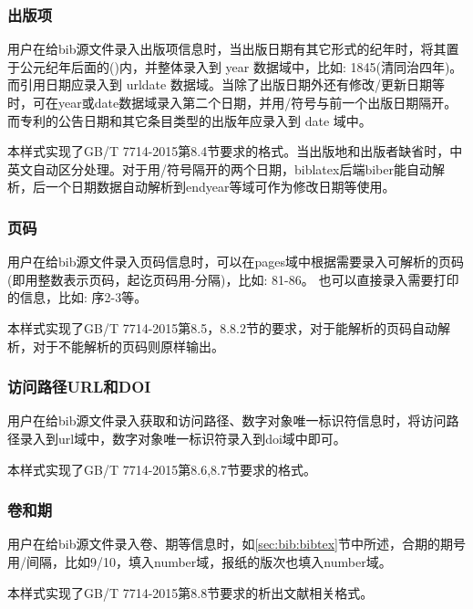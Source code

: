 \subsubsection{出版项}\label{sec:fmt:pubitem}

\begin{property}{}{}
用户在给bib源文件录入出版项信息时，当出版日期有其它形式的纪年时，将其置于公元纪年后面的()内，并整体录入到 year 数据域中，比如: 1845(清同治四年)。而引用日期应录入到 urldate 数据域。当除了出版日期外还有修改/更新日期等时，可在year或date数据域录入第二个日期，并用/符号与前一个出版日期隔开。而专利的公告日期和其它条目类型的出版年应录入到 date 域中。

本样式实现了GB/T 7714-2015第8.4节要求的格式。当出版地和出版者缺省时，中英文自动区分处理。对于用/符号隔开的两个日期，biblatex后端biber能自动解析，后一个日期数据自动解析到endyear等域可作为修改日期等使用。
\end{property}

\subsubsection{页码}\label{sec:fmt:pages}
\begin{property}{}{}
用户在给bib源文件录入页码信息时，可以在pages域中根据需要录入可解析的页码(即用整数表示页码，起讫页码用-分隔)，比如: 81-86。 也可以直接录入需要打印的信息，比如: 序2-3等。

本样式实现了GB/T 7714-2015第8.5，8.8.2节的要求，对于能解析的页码自动解析，对于不能解析的页码则原样输出。
\end{property}

\subsubsection{访问路径URL和DOI}
\begin{property}{}{}
用户在给bib源文件录入获取和访问路径、数字对象唯一标识符信息时，将访问路径录入到url域中，数字对象唯一标识符录入到doi域中即可。

本样式实现了GB/T 7714-2015第8.6,8.7节要求的格式。
\end{property}

\subsubsection{卷和期}\label{sec:fmt:volnum}
\begin{property}{}{}%
用户在给bib源文件录入卷、期等信息时，如\ref{sec:bib:bibtex}节中所述，合期的期号用/间隔，比如9/10，填入number域，报纸的版次也填入number域。

本样式实现了GB/T 7714-2015第8.8节要求的析出文献相关格式。
\end{property}




